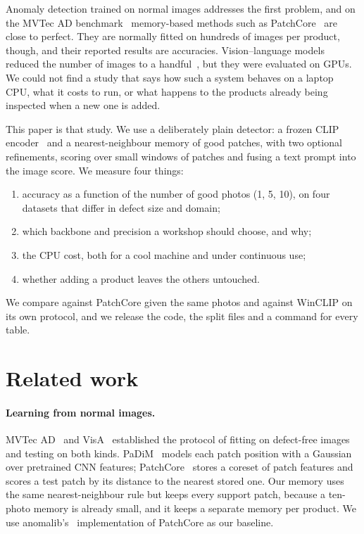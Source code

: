 \documentclass[10pt,twocolumn]{article}
\begin{document}
Anomaly detection trained on normal images addresses the first problem, and on
the MVTec AD benchmark~\cite{bergmann2019mvtec} memory-based methods such as
PatchCore~\cite{roth2022patchcore} are close to perfect. They are normally fitted
on hundreds of images per product, though, and their reported results are
accuracies. Vision--language models reduced the number of images to a
handful~\cite{jeong2023winclip}, but they were evaluated on GPUs. We could not
find a study that says how such a system behaves on a laptop CPU, what it costs
to run, or what happens to the products already being inspected when a new one is
added.

This paper is that study. We use a deliberately plain detector: a frozen CLIP
encoder~\cite{radford2021clip,cherti2023openclip} and a nearest-neighbour memory
of good patches, with two optional refinements, scoring over small windows of
patches and fusing a text prompt into the image score. We measure four things:
\begin{enumerate}
\item accuracy as a function of the number of good photos (1, 5, 10), on four
  datasets that differ in defect size and domain;
\item which backbone and precision a workshop should choose, and why;
\item the CPU cost, both for a cool machine and under continuous use;
\item whether adding a product leaves the others untouched.
\end{enumerate}
We compare against PatchCore given the same photos and against WinCLIP on its
own protocol, and we release the code, the split files and a command for every
table.

\section{Related work}

\paragraph{Learning from normal images.} MVTec AD~\cite{bergmann2019mvtec} and
VisA~\cite{zou2022visa} established the protocol of fitting on defect-free images
and testing on both kinds. PaDiM~\cite{defard2021padim} models each patch position
with a Gaussian over pretrained CNN features; PatchCore~\cite{roth2022patchcore}
stores a coreset of patch features and scores a test patch by its distance to the
nearest stored one. Our memory uses the same nearest-neighbour rule but keeps
every support patch, because a ten-photo memory is already small, and it keeps a
separate memory per product. We use anomalib's~\cite{akcay2022anomalib}
implementation of PatchCore as our baseline.
\end{document}
